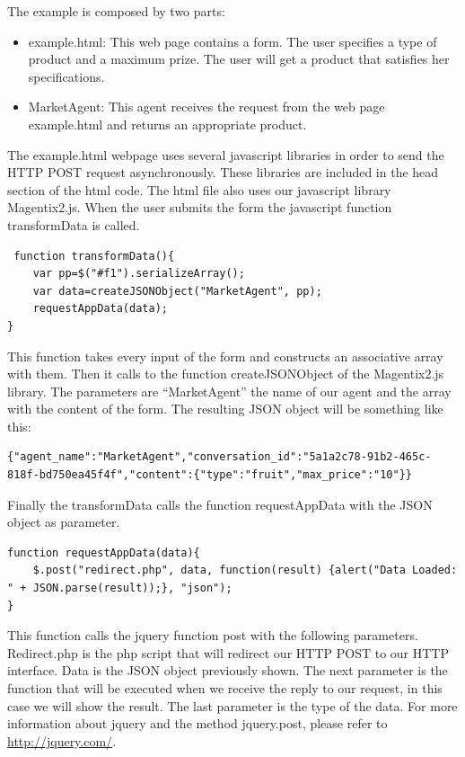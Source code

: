 The example is composed by two parts:
\begin{itemize}
   \item example.html: This web page contains a form. The user specifies a type of product and a maximum prize. The user will get a product that satisfies her specifications.
   \item MarketAgent: This agent receives the request from the web page example.html and returns an appropriate product.%
\end{itemize}

The example.html webpage uses several javascript libraries in order to send the HTTP POST request asynchronously. These libraries are included in the head section of the html code. The html file also uses our javascript library Magentix2.js. When the user submits the form the javascript function transformData is called.

\begin{lstlisting}
 function transformData(){
	var pp=$("#f1").serializeArray();
	var data=createJSONObject("MarketAgent", pp);
	requestAppData(data);
}
\end{lstlisting}

This function takes every input of the form and constructs an associative array with them. Then it calls to the function createJSONObject of the Magentix2.js library. The parameters are ``MarketAgent'' the name of our agent and the array with the content of the form. The resulting JSON object will be something like this:

\begin{lstlisting}
{"agent_name":"MarketAgent","conversation_id":"5a1a2c78-91b2-465c-818f-bd750ea45f4f","content":{"type":"fruit","max_price":"10"}}
\end{lstlisting}

Finally the transformData calls the function requestAppData with the JSON object as parameter. 

\begin{lstlisting}
function requestAppData(data){
	$.post("redirect.php", data, function(result) {alert("Data Loaded: " + JSON.parse(result));}, "json");
}
\end{lstlisting}

This function calls the jquery function post with the following parameters. Redirect.php is the php script that will redirect our HTTP POST to our HTTP interface. Data is the JSON object previously shown. The next parameter is the function that will be executed when we receive the reply to our request, in this case we will show the result. The last parameter is the type of the data. For more information about jquery and the method jquery.post, please refer to \url{http://jquery.com/}.

